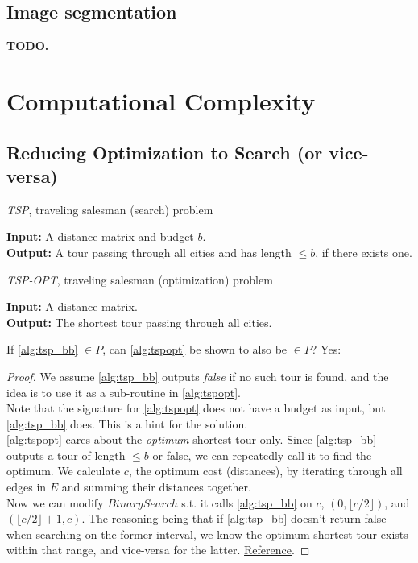 \documentclass{article}
\theoremstyle{definition}
\begin{document}
\subsection{Image segmentation}
\textbf{TODO.}

\section{Computational Complexity}
\subsection{Reducing Optimization to Search (or vice-versa)}
\begin{algorithm}
	\caption{\textit{TSP}, traveling salesman (search) problem}
	\label{alg:tsp_bb}
	\hspace*{\algorithmicindent} \textbf{Input:} A distance matrix and budget $b$.\\
	\hspace*{\algorithmicindent} \textbf{Output:} A tour passing through all cities and has length $\leq b$, if there exists one.
\end{algorithm}
\begin{algorithm}
	\caption{\textit{TSP-OPT}, traveling salesman (optimization) problem}
	\label{alg:tspopt}
	\hspace*{\algorithmicindent} \textbf{Input:} A distance matrix.\\
	\hspace*{\algorithmicindent} \textbf{Output:} The shortest tour passing through all cities.
\end{algorithm}

If \ref{alg:tsp_bb} $\in P$, can \ref{alg:tspopt} be shown to also be $\in P$? Yes:

\begin{proof}
	We assume \ref{alg:tsp_bb} outputs \textit{false} if no such tour is found, and the idea is to use it as a sub-routine in \ref{alg:tspopt}.\\
	Note that the signature for \ref{alg:tspopt} does not have a budget as input, but \ref{alg:tsp_bb} does. This is a hint for the solution.\\
	\ref{alg:tspopt} cares about the \textit{optimum} shortest tour only. Since \ref{alg:tsp_bb} outputs a tour of length $\leq b$ or false, we can repeatedly call it to find the optimum.
	We calculate $c$, the optimum cost (distances), by iterating through all edges in $E$ and summing their distances together.\\
	Now we can modify $BinarySearch$ s.t. it calls \ref{alg:tsp_bb} on $c$, $(0, \lfloor c/2 \rfloor)$, and $(\lfloor c/2 \rfloor +1, c)$. The reasoning being that if \ref{alg:tsp_bb} doesn't return false when searching on the former interval, we know the optimum shortest tour exists within that range, and vice-versa for the latter. \href{https://cseweb.ucsd.edu/classes/sp08/cse101/hw/hw6soln.pdf}{Reference}.
\end{proof}
\end{document}
